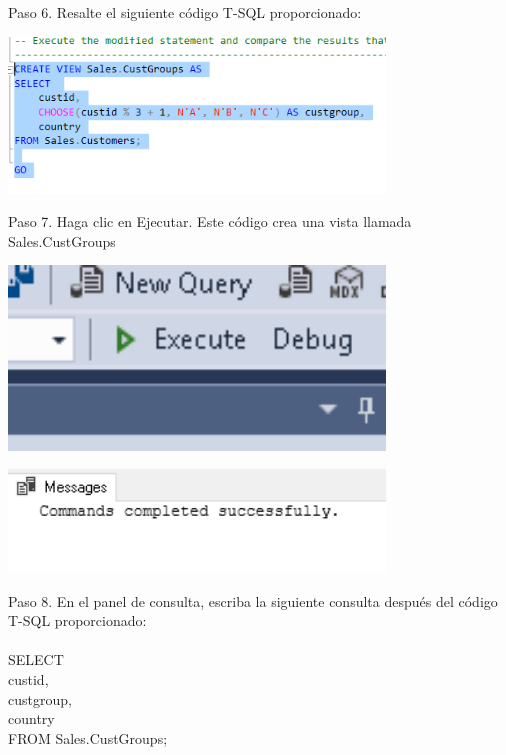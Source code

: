 \begin{flushleft}
Paso 6. Resalte el siguiente código T-SQL proporcionado:

\begin{center}
	\includegraphics[width=10cm]{./Imagenes/img6} 
	\end{center}

Paso 7. Haga clic en Ejecutar. Este código crea una vista llamada Sales.CustGroups
\begin{center}
	\includegraphics[width=10cm]{./Imagenes/img7} 
	\end{center}
\begin{center}
	\includegraphics[width=10cm]{./Imagenes/img71} 
	\end{center}

Paso 8. En el panel de consulta, escriba la siguiente consulta después del código T-SQL proporcionado:
\textbf{}\\
\textbf{}\\
SELECT\\
custid,\\
custgroup,\\
country\\
FROM Sales.CustGroups;\\


\end{flushleft}
